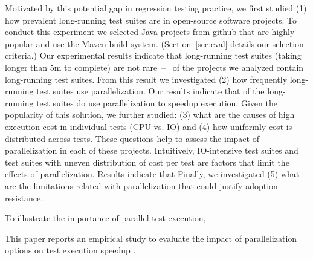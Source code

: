 Motivated by this potential gap in regression testing practice, we
first studied (1) how prevalent long-running test suites are in
open-source software projects.  To conduct this experiment we selected
\numSubjs{} Java projects from github that are highly-popular and use
the Maven build system.  (Section~\ref{sec:eval} details our selection
criteria.)  Our experimental results indicate that long-running test
suites (taking longer than 5m to complete) are not rare~--~ of the
projects we analyzed contain long-running test suites.  From this
result we investigated (2) how frequently long-running test suites use
parallelization.  Our results
indicate that  of the long-running test suites do use
parallelization to speedup execution.  Given the popularity of this
solution, we further studied: (3) what are the causes of high
execution cost in individual tests (CPU vs. IO) and (4) how uniformly
cost is distributed across tests.  These questions help to assess the
impact of parallelization in each of these projects.  Intuitively,
IO-intensive test suites and test suites with uneven distribution of
cost per test are factors that limit the effects of parallelization.
Results indicate that   Finally, we investigated (5) what are
the limitations related with parallelization that could justify
adoption resistance.

\Fix{--------------}

To illustrate the importance of parallel test execution, 

This paper reports an empirical study to evaluate the impact of
parallelization options on test execution speedup  .

